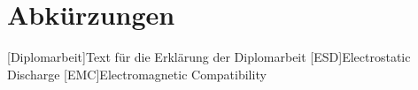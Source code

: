 %
%
\section*{Abkürzungen}
%
\begin{acronym}[längstesAcronym]
\setlength{\itemsep}{-0.3 \parsep}
%
%
[Diplomarbeit]{Text für die Erklärung der Diplomarbeit}
[ESD]{Electrostatic Discharge}
[EMC]{Electromagnetic Compatibility}
%
%
%
\end{acronym}
